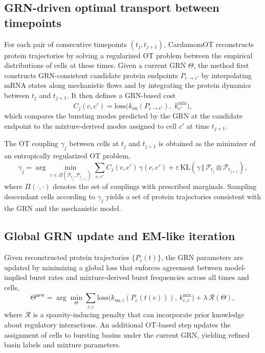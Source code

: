 \documentclass[10pt]{article}
\begin{document}
\subsection{GRN-driven optimal transport between timepoints}

For each pair of consecutive timepoints $(t_j,t_{j+1})$, CardamomOT reconstructs protein trajectories by solving a regularized OT problem between the empirical distributions of cells at these times.  Given a current GRN $\Theta$, the method first constructs GRN-consistent candidate protein endpoints $P_{c\to c'}$ by interpolating mRNA states along mechanistic flows and by integrating the protein dynamics between $t_j$ and $t_{j+1}$.  It then defines a GRN-based cost
\begin{equation}
    C_j(c,c') = \mathrm{loss}\bigl(k_{\mathrm{on}}(P_{c\to c'}),\;k^{\mathrm{mix}}_{c'}\bigr),
    \label{mechanistic_cost}
\end{equation}
which compares the bursting modes predicted by the GRN at the candidate endpoint to the mixture-derived modes assigned to cell $c'$ at time $t_{j+1}$. 

The OT coupling $\gamma_j$ between cells at $t_j$ and $t_{j+1}$ is obtained as the minimizer of an entropically regularized OT problem,
\[
\gamma_j = \arg\min_{\gamma \in \Pi(\mathcal{P}_{t_j},\mathcal{P}_{t_{j+1}})}
\sum_{c,c'} C_j(c,c')\,\gamma(c,c')
+
\varepsilon\,\mathrm{KL}(\gamma \,\Vert\, \mathcal{P}_{t_j}\otimes \mathcal{P}_{t_{j+1}}),
\]
where $\Pi(\cdot,\cdot)$ denotes the set of couplings with prescribed marginals.  Sampling descendant cells according to $\gamma_j$ yields a set of protein trajectories consistent with the GRN and the mechanistic model. 

\subsection{Global GRN update and EM-like iteration}

Given reconstructed protein trajectories $\{P_c(t)\}$, the GRN parameters are updated by minimizing a global loss that enforces agreement between model-implied burst rates and mixture-derived burst frequencies across all times and cells,
\[
\Theta^{\mathrm{new}} = \arg\min_{\Theta} 
\sum_{c,i} \mathrm{loss}\bigl(k_{\mathrm{on},i}(P_c(t(c))),\,k^{\mathrm{mix}}_{c,i}\bigr)
+ \lambda \,\mathcal{R}(\Theta),
\]
where $\mathcal{R}$ is a sparsity-inducing penalty that can incorporate prior knowledge about regulatory interactions.  An additional OT-based step updates the assignment of cells to bursting basins under the current GRN, yielding refined basin labels and mixture parameters. 
\end{document}
